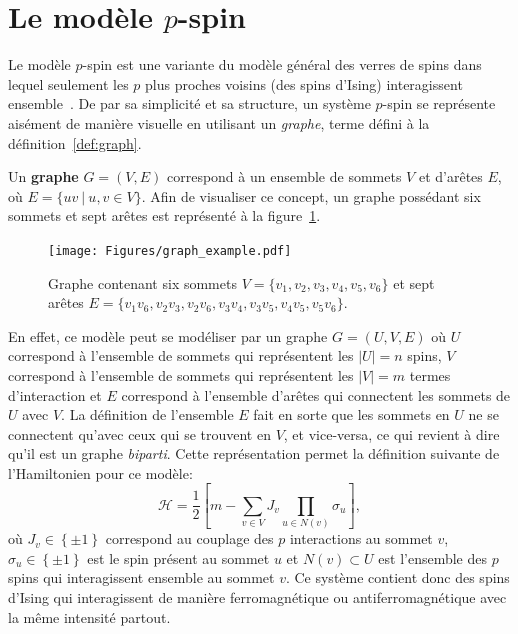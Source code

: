 \section{Le modèle \texorpdfstring{$p$}{p}-spin} \label{sec:p-spin}
Le modèle $p$-spin est une variante du modèle général des verres de spins dans lequel seulement les $p$ plus proches voisins (des spins d'Ising) interagissent ensemble~\cite{}.
De par sa simplicité et sa structure, un système $p$-spin se représente aisément de manière visuelle en utilisant un \emph{graphe}, terme défini à la définition~\ref{def:graph}.
\begin{definition}\label{def:graph}
    Un \textbf{graphe} $G = (V, E)$ correspond à un ensemble de sommets $V$ et d'arêtes $E$, où $E = \{uv\ |\ u, v \in V\}$. Afin de visualiser ce concept, un graphe possédant six sommets  et sept arêtes est représenté à la figure~\ref{fig:random-graph}.
\end{definition}
\begin{figure}[h]
    \centering
    \texttt{[image: Figures/graph\_example.pdf]}
    \caption{Graphe contenant six sommets $V = \{v_1, v_2, v_3, v_4, v_5, v_6\}$ et sept arêtes $E = \{v_1v_6, v_2v_3, v_2v_6, v_3v_4, v_3v_5, v_4v_5, v_5v_6\}$.}
    \label{fig:random-graph}
\end{figure}
En effet, ce modèle peut se modéliser par un graphe $G = (U, V, E)$ où $U$ correspond à l'ensemble de sommets qui représentent les $|U| = n$ spins, $V$ correspond à l'ensemble de sommets qui représentent les $|V| = m$ termes d'interaction et $E$ correspond à l'ensemble d'arêtes qui connectent les sommets de $U$ avec $V$.
La définition de l'ensemble $E$ fait en sorte que les sommets en $U$ ne se connectent qu'avec ceux qui se trouvent en $V$, et vice-versa, ce qui revient à dire qu'il est un graphe \emph{biparti}.
Cette représentation permet la définition suivante de l'Hamiltonien pour ce modèle:
\begin{equation} \label{eq:ham_p-spin}
    \mathcal{H} = \frac{1}{2} \left[m -\sum_{v \in V} J_{v}\prod_{u \in N(v)} \sigma_{u} \right],
\end{equation}
où $J_v \in \left\{\pm1\right\}$ correspond au couplage des $p$ interactions au sommet $v$, $\sigma_u \in \left\{\pm1\right\}$ est le spin présent au sommet $u$ et $N(v) \subset U$ est l'ensemble des $p$ spins qui interagissent ensemble au sommet $v$.
Ce système contient donc des spins d'Ising qui interagissent de manière ferromagnétique ou antiferromagnétique avec la même intensité partout.
